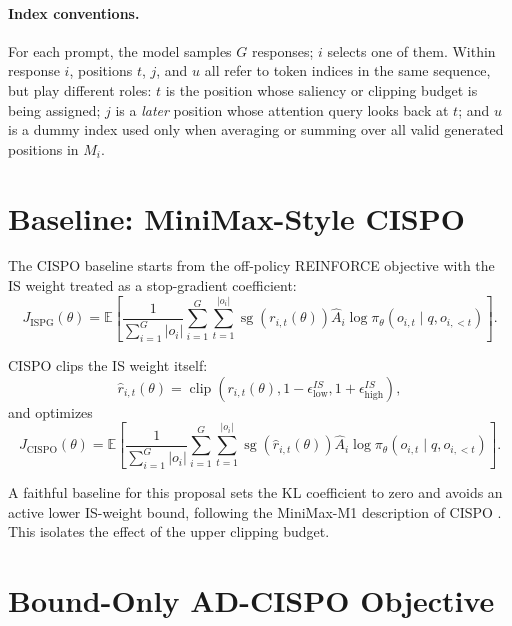 \documentclass[11pt]{article}
\begin{document}
\paragraph{Index conventions.}
For each prompt, the model samples $G$ responses; $i$ selects one of them.
Within response $i$, positions $t$, $j$, and $u$ all refer to token indices in
the same sequence, but play different roles: $t$ is the position whose saliency
or clipping budget is being assigned; $j$ is a \emph{later} position whose
attention query looks back at $t$; and $u$ is a dummy index used only when
averaging or summing over all valid generated positions in $M_i$.

\section{Baseline: MiniMax-Style CISPO}

The CISPO baseline starts from the off-policy REINFORCE objective with the IS
weight treated as a stop-gradient coefficient:
\begin{equation}
  J_{\mathrm{ISPG}}(\theta)
  =
  \mathbb{E}
  \left[
    \frac{1}{\sum_{i=1}^G |o_i|}
    \sum_{i=1}^G \sum_{t=1}^{|o_i|}
    \operatorname{sg}\!\left(r_{i,t}(\theta)\right)
    \hat{A}_i
    \log \pi_\theta(o_{i,t}\mid q,o_{i,<t})
  \right].
\end{equation}

CISPO clips the IS weight itself:
\begin{equation}
  \hat{r}_{i,t}(\theta)
  =
  \operatorname{clip}
  \left(
    r_{i,t}(\theta),
    1-\epsilon^{IS}_{\mathrm{low}},
    1+\epsilon^{IS}_{\mathrm{high}}
  \right),
\end{equation}
and optimizes
\begin{equation}
  J_{\mathrm{CISPO}}(\theta)
  =
  \mathbb{E}
  \left[
    \frac{1}{\sum_{i=1}^G |o_i|}
    \sum_{i=1}^G \sum_{t=1}^{|o_i|}
    \operatorname{sg}\!\left(\hat{r}_{i,t}(\theta)\right)
    \hat{A}_i
    \log \pi_\theta(o_{i,t}\mid q,o_{i,<t})
  \right].
\end{equation}

A faithful baseline for this proposal sets the KL coefficient to zero and
avoids an active lower IS-weight bound, following the MiniMax-M1 description of
CISPO \cite{minimax2025m1}. This isolates the effect of the upper clipping
budget.

\section{Bound-Only AD-CISPO Objective}
\end{document}
